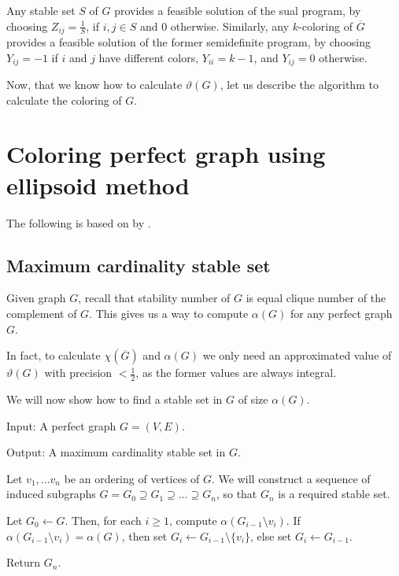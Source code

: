 Any stable set $S$ of $G$ provides a feasible solution of the sual program, by choosing $Z_{ij} = \frac{1}{S}$, if $i, j \in S$ and 0 otherwise. Similarly, any $k$-coloring of $\overline{G}$ provides a feasible solution of the former semidefinite program, by choosing $Y_{ij} = -1$ if $i$ and $j$ have different colors, $Y_{ii} = k-1$, and $Y_{ij} = 0$ otherwise.

Now, that we know how to calculate $\vartheta(G)$, let us describe the algorithm to calculate the coloring of $G$.

\section{Coloring perfect graph using ellipsoid method}
\label{sec:coloringEllipsoid}
The following is based on  by \citeauthor{Laurent2005} \cite{Laurent2005}.

\subsection{Maximum cardinality stable set}

Given graph $G$, recall that stability number of $G$ is equal clique number of the complement of $G$. This gives us a way to compute $\alpha(G)$ for any perfect graph $G$.

In fact, to calculate $\chi(\overline{G})$ and $\alpha(G)$ we only need an approximated value of $\vartheta(G)$ with precision $< \frac{1}{2}$, as the former values are always integral.

We will now show how to find a stable set in $G$ of size $\alpha(G)$.

\begin{alg}
  \label{alg:maxStableSet}
  Input: A perfect graph $G = (V, E)$.

  \noindent Output: A maximum cardinality stable set in $G$.
\end{alg}
\begin{algtext2}
  Let $v_1, \ldots v_n$ be an ordering of vertices of $G$. We will construct a sequence of induced subgraphs $G = G_0 \supseteq G_1 \supseteq \ldots \supseteq G_n$, so that $G_n$ is a required stable set.

  Let $G_0 \leftarrow G$. Then, for each $i \geq 1$, compute $\alpha(G_{i-1} \setminus v_i)$. If $\alpha(G_{i-1} \setminus v_i) = \alpha(G)$, then set $G_i \leftarrow G_{i-1} \setminus \{v_i\}$, else set $G_i \leftarrow G_{i-1}$.

  Return $G_n$.
\end{algtext2}

